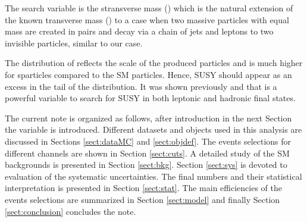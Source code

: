 The search variable is the stransverse mass (\mttwo) which is the natural extension of the known transverse mass (\mt) to a case 
when two massive particles with equal mass are created in pairs and decay via a chain of jets and leptons to two 
invisible particles, similar to our case.

The distribution of \mttwo reflects the scale of the produced particles and is much higher for sparticles
compared to the SM particles. Hence, SUSY should appear as an excess in the tail of the \mttwo distribution.
It was shown previously  \cite{Khachatryan:2014qwa}  and \cite{MT2_2011} that \mttwo is a powerful variable to search for SUSY in both
 leptonic and hadronic final states.

The current note is organized as follows, after introduction in the next Section the \mttwo variable is introduced. Different datasets 
and objects used in this analysis are discussed in Sections \ref{sect:dataMC} and \ref{sect:objdef}. The events selections for different channels
are shown in Section \ref{sect:cuts}. A detailed study of the SM backgrounds is presented in Section \ref{sect:bkg}. Section \ref{sect:sys} 
is devoted to evaluation of the systematic uncertainties. The final numbers and their statistical interpretation is presented in 
Section \ref{sect:stat}. The main efficiencies of the events selections are summarized in Section \ref{sect:model} and finally Section \ref{sect:conclusion} concludes the note.





